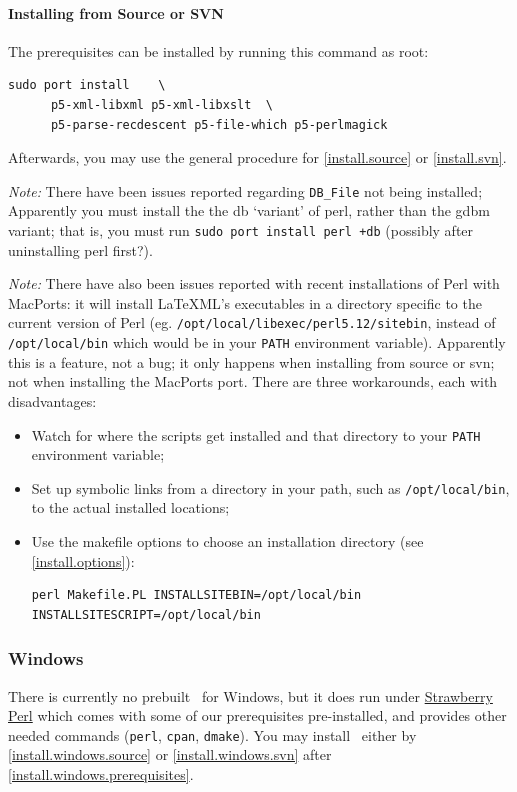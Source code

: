 \documentclass{article}
\begin{document}
\paragraph{Installing from Source or SVN}
The prerequisites can be installed by running this command as root: 
\begin{lstlisting}[style=shell]
  sudo port install    \
      p5-xml-libxml p5-xml-libxslt  \
      p5-parse-recdescent p5-file-which p5-perlmagick
\end{lstlisting}
Afterwards, you may use the general procedure for
\ref{install.source} or \ref{install.svn}.

\emph{Note:} There have been issues reported regarding \verb|DB_File|
not being installed;  Apparently you must install the 
the db `variant' of perl, rather than the gdbm variant;
that is, you must run \verb|sudo port install perl +db|
(possibly after uninstalling perl first?).

\emph{Note:} There have also been issues reported with recent
installations of Perl with MacPorts:  it will install LaTeXML's
executables in a directory specific to the current version of Perl
(eg. \texttt{/opt/local/libexec/perl5.12/sitebin},
instead of \texttt{/opt/local/bin} which would be in your \texttt{PATH} environment variable).
Apparently this is a feature, not a bug; it only happens when installing from source or svn;
not when installing the MacPorts port.  There are three workarounds, each with disadvantages:
\begin{itemize}
\item Watch for where the scripts get installed and that directory to your \texttt{PATH}
  environment variable;
\item Set up symbolic links from a directory in your path, such as \texttt{/opt/local/bin},
  to the actual installed locations;
\item Use the makefile options to choose an installation directory (see \ref{install.options}):
\begin{lstlisting}[style=shell]
  perl Makefile.PL INSTALLSITEBIN=/opt/local/bin INSTALLSITESCRIPT=/opt/local/bin
\end{lstlisting}
\end{itemize}

\subsubsection{Windows}\label{install.windows}
There is currently no prebuilt \LaTeXML\ for Windows,
but it does run under \href{http://strawberryperl.com}{Strawberry Perl}
which comes with some of our prerequisites pre-installed,
and provides other needed commands (\texttt{perl}, \texttt{cpan}, \texttt{dmake}).
You may install \LaTeXML\ either by \ref{install.windows.source}
or \ref{install.windows.svn} after \ref{install.windows.prerequisites}.
\end{document}
